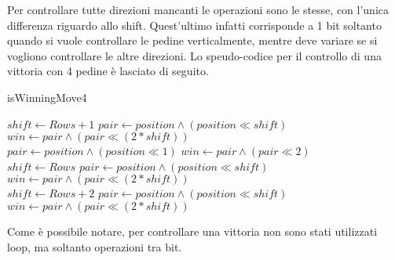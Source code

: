 \documentclass[a4paper]{article}
\begin{document}
Per controllare tutte direzioni mancanti le operazioni sono le stesse, con
l'unica differenza riguardo allo shift. Quest'ultimo infatti corrisponde a 1 bit
soltanto quando si vuole controllare le pedine verticalmente, mentre deve
variare se si vogliono controllare le altre direzioni. Lo speudo-codice per il
controllo di una vittoria con 4 pedine è lasciato di seguito.

\begin{algorithm}
  \caption{isWinningMove4} 
  \begin{algorithmic}
      \State $shift \gets Rows + 1$
      \State $pair \gets position \land (position \ll shift)$
      \State $win \gets pair \land (pair \ll (2 * shift))$
        \State {}
      \EndIf
      \\
      \State $pair \gets position \land (position \ll 1)$
      \State $win \gets pair \land (pair \ll 2)$
        \State {}
      \EndIf
      \\
      \State $shift \gets Rows$
      \State $pair \gets position \land (position \ll shift)$
      \State $win \gets pair \land (pair \ll (2 * shift))$
        \State {}
      \EndIf
      \\
      \State $shift \gets Rows + 2$
      \State $pair \gets position \land (position \ll shift)$
      \State $win \gets pair \land (pair \ll (2 * shift))$
        \State {}
      \EndIf
      \\
      \State {}
    \EndFunction
  \end{algorithmic}
\end{algorithm}

Come è possibile notare, per controllare una vittoria non sono stati utilizzati
loop, ma soltanto operazioni tra bit.
\end{document}

